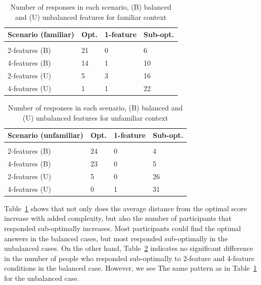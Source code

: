 \begin{table}[ht]
    \caption{Number of responses in each scenario, (B) balanced and (U) unbalanced features for familiar context} 
    \label{table:number-of-responses-fam}
    \begin{center}
        \begin{tabular}{llll}
        \textbf{Scenario (familiar)}  &\textbf{Opt.} &\textbf{1-feature} &\textbf{Sub-opt.} \\
        \hline \\[-4.8pt]
        2-features (B) & 21 & 0 & 6 \\
        4-features (B) & 14 & 1 & 10 \\
        2-features (U) & 5 & 3 & 16 \\
        4-features (U) & 1 & 1 & 22
        \end{tabular}
    \end{center}
\end{table}

\begin{table}[ht]
    \caption{Number of responses in each scenario, (B) balanced and (U) unbalanced features for unfamiliar context} 
    \label{table:number-of-responses-unf}
    \begin{center}
        \begin{tabular}{llll}
        \textbf{Scenario (unfamiliar)}  &\textbf{Opt.} &\textbf{1-feature} &\textbf{Sub-opt.} \\
        \hline \\[-4.8pt]
        2-features (B) & 24 & 0 & 4 \\
        4-features (B) & 23 & 0 & 5 \\
        2-features (U) & 5 & 0 & 26 \\
        4-features (U) & 0 & 1 & 31
        \end{tabular}
    \end{center}
\end{table}

Table~\ref{table:number-of-responses-fam} shows that not only does the average distance from the optimal score increase with added complexity, but also the number of participants that responded sub-optimally increases. Most participants could find the optimal answers in the balanced cases, but most responded sub-optimally in the unbalanced cases. On the other hand, Table~\ref{table:number-of-responses-unf} indicates no significant difference in the number of people who responded sub-optimally to 2-feature and 4-feature conditions in the balanced case. However, we see The same pattern as in Table~\ref{table:number-of-responses-fam} for the unbalanced case.

